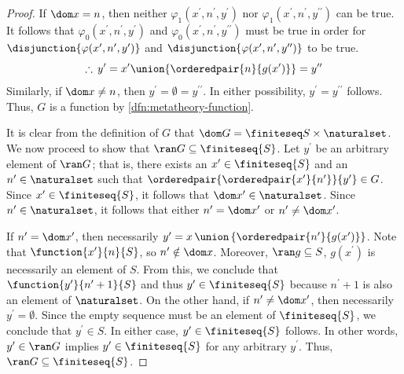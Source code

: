 \begin{proof}
    \vspace{0.3cm}
    \noindent
    If \( \dom x = n \), then neither \( \varphi_{1}(x^{\prime}, n^{\prime}, y^{\prime}) \) nor \( \varphi_{1}(x^{\prime}, n^{\prime}, y^{\prime\prime}) \) can be true.
    It follows that \( \varphi_{0}(x^{\prime}, n^{\prime}, y^{\prime}) \) and \( \varphi_{0}(x^{\prime}, n^{\prime}, y^{\prime\prime}) \) must be true in order for
    \( \disjunction{\varphi(x^{\prime}, n^{\prime}, y^{\prime})} \) and \( \disjunction{\varphi(x^{\prime}, n^{\prime}, y^{\prime\prime})} \) to be true.
    \begin{equation*}
        \therefore \, y^{\prime} = x^{\prime} \union \mleft\{ \orderedpair{n}{g(x^{\prime})} \mright\} = y^{\prime\prime}
    \end{equation*}
    Similarly, if \( \dom x \neq n \), then \( y^{\prime} = \emptyset = y^{\prime\prime} \).
    In either possibility, \( y^{\prime} = y^{\prime\prime} \) follows.
    Thus, \( G \) is a function by \cref{dfn:metatheory-function}.
    
    \vspace{0.3cm}
    \noindent
    It is clear from the definition of \( G \) that \( \dom G = \finiteseq S \times \naturalset \).
    We now proceed to show that \( \ran G \subseteq \finiteseq{S} \).
    Let \( y^{\prime} \) be an arbitrary element of \( \ran G \); that is, there exists an \( x^{\prime} \in \finiteseq{S} \)
    and an \( n^{\prime} \in \naturalset \) such that \( \orderedpair{\orderedpair{x^{\prime}}{n^{\prime}}}{y^{\prime}} \in G \).
    Since \( x^{\prime} \in \finiteseq{S} \), it follows that \( \dom x^{\prime} \in \naturalset \). Since \( n^{\prime} \in \naturalset \),
    it follows that either \( n^{\prime} = \dom x^{\prime}  \) or \( n^{\prime} \neq \dom x^{\prime} \).

    \vspace{0.3cm}
    \noindent
    If \( n^{\prime} = \dom x^{\prime} \), then necessarily \( y^{\prime} = x \,{\union}\, \mleft\{ \orderedpair{n^{\prime}}{g(x^{\prime})} \mright\}  \).
    Note that \( \function{x^{\prime}}{n}{S} \), so \( n^{\prime} \notin \dom x \).
    Moreover, \( \ran g \subseteq S \), \( g(x^{\prime}) \) is necessarily an element of \( S \).
    From this, we conclude that \( \function{y^{\prime}}{n^{\prime} + 1}{S} \) and thus \( y^{\prime} \in \finiteseq{S} \) because \( n^{\prime} + 1 \)
    is also an element of \( \naturalset \).
    On the other hand, if \( n^{\prime} \neq \dom x^{\prime} \), then necessarily \( y^{\prime} = \emptyset \).
    Since the empty sequence must be an element of \( \finiteseq{S} \), we conclude that \( y^{\prime} \in S \).
    In either case, \( y^{\prime} \in \finiteseq{S} \) follows. In other words,
    \( y^{\prime} \in \ran G \) implies \( y^{\prime} \in \finiteseq{S} \) for any arbitrary \( y^{\prime} \).
    Thus, \( \ran G \subseteq \finiteseq{S} \).


\end{proof}
